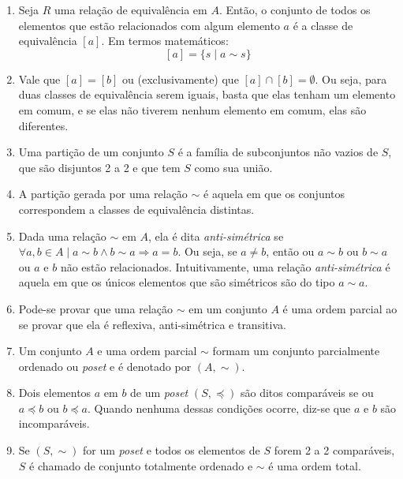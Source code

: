 \documentclass{article}
\begin{document}
\begin{enumerate}
	\item Seja \( R \) uma relação de equivalência em \( A \). Então, o conjunto de todos os elementos que estão relacionados com algum elemento \( a \) é a classe de equivalência \( [a] \). Em termos matemáticos:
	      \[ [a] = \{ s \mid a \sim s\} \]

	\item Vale que \( [a] = [b] \) ou (exclusivamente) que \( [a] \cap [b] = \emptyset \). Ou seja, para duas classes de equivalência serem iguais, basta que elas tenham um elemento em comum, e se elas não tiverem nenhum elemento em comum, elas são diferentes.

	\item Uma partição de um conjunto \( S \) é a família de subconjuntos não vazios de \( S \), que são disjuntos 2 a 2 e que tem \( S \) como sua união.

	\item A partição gerada por uma relação \( \sim \) é aquela em que os conjuntos correspondem a classes de equivalência distintas.

	\item Dada uma relação \( \sim \) em \( A \), ela é dita \textit{anti-simétrica} se \( \forall a,b \in A \mid a \sim b \land b \sim a \Rightarrow a = b \). Ou seja, se \( a \neq b \), então ou \( a \sim b \) ou \( b \sim a \) ou \( a \) e \( b \) não estão relacionados. Intuitivamente, uma relação \textit{anti-simétrica} é aquela em que os únicos elementos que são simétricos são do tipo \( a \sim a \).

	\item Pode-se provar que uma relação \( \sim \) em um conjunto \( A \) é uma ordem parcial ao se provar que ela é reflexiva, anti-simétrica e transitiva.

	\item Um conjunto \( A \) e uma ordem parcial \( \sim \) formam um conjunto parcialmente ordenado ou \textit{poset} e é denotado por \( (A, \sim) \).

	\item Dois elementos \( a \) em \( b \) de um \textit{poset} \( (S, \preceq) \) são ditos comparáveis se ou \( a \preceq b \) ou \( b \preceq a \). Quando nenhuma dessas condições ocorre, diz-se que \( a \) e \( b \) são incomparáveis.

	\item Se \( (S, \sim ) \) for um \textit{poset} e todos os elementos de \( S \) forem 2 a 2 comparáveis, \( S \) é chamado de conjunto totalmente ordenado e \( \sim \) é uma ordem total.


\end{enumerate}
\end{document}

